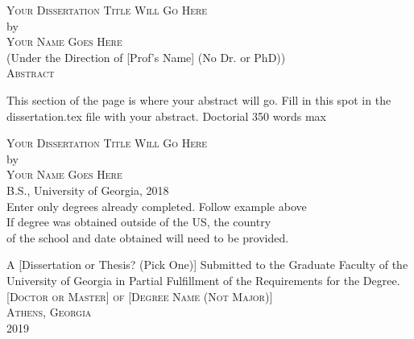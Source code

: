 \documentclass[12pt, notitlepage ]{report}
\begin{document}

\newcommand{\doctitle}{Your Dissertation Title Will Go Here}
\newcommand{\docauthor}{Your Name Goes Here}



\newpage
{}

\thispagestyle{empty}
\vspace*{18pt}
\begin{center}
  \textsc{\large{\doctitle}}\\[18pt]  %
  by\\[18pt]
  \textsc{\docauthor}\\[12pt]
  (Under the Direction of [Prof's Name] (No Dr. or PhD))\\[12pt]
  \textsc{Abstract}
\end{center}

This section of the page is where your abstract will go. Fill in this spot in the dissertation.tex file with your abstract. Doctorial 350 words max

\thispagestyle{empty}

\begin{list}{\textsc{Index words:\hfill}}{\leftmargin 1.4in}
  \item \begin{flushleft}
  \end{flushleft}
\end{list}


\newpage
\thispagestyle{empty}
\vspace*{18pt}
\begin{center}
  \textsc{\doctitle}\\[18pt]
  by\\[12pt]
  \textsc{\docauthor}\\[8pt]
  B.S., University of Georgia, 2018\\
  Enter only degrees already completed. Follow example above\\
  If degree was obtained outside of the US, the country \\
  of the school and date obtained will need to be provided.

  \vfill
  A [Dissertation or Thesis? (Pick One)] Submitted to the Graduate Faculty of the\\ University of Georgia in Partial Fulfillment of the Requirements for the Degree.\\ [18pt]

  \textsc{[Doctor or Master] of [Degree Name (Not Major)]}\\[24pt]
  \textsc{Athens, Georgia}\\[18pt]
  2019
\end{center}
\end{document}
